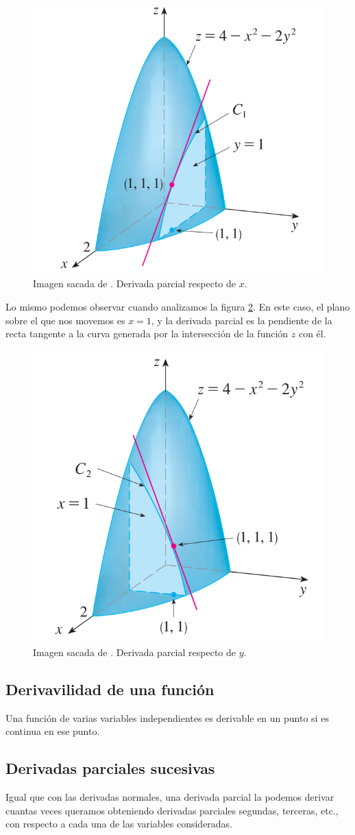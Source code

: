 \documentclass[12pt]{article}
\begin{document}
\begin{figure}[H]
  \centering
  \includegraphics[width=0.3\linewidth]{imagenes/interp_geom_derivada_paracial_x.png}
  \caption{Imagen sacada de \parencite{stewart2}. Derivada parcial respecto de $ x $.}
  \label{fig:derivada_parcial_x}
\end{figure}

Lo mismo podemos observar cuando analizamos la figura \ref{fig:derivada_parcial_y}. En este caso, el plano sobre el que nos movemos es $ x = 1 $, y la derivada parcial es la pendiente de la recta tangente a la curva generada por la intersección de la función $ z $ con él.

\begin{figure}[H]
  \centering
  \includegraphics[width=0.3\linewidth]{imagenes/interp_geom_derivada_paracial_y.png}
  \caption{Imagen sacada de \parencite{stewart2}. Derivada parcial respecto de $ y $.}
  \label{fig:derivada_parcial_y}
\end{figure}

\subsection*{Derivavilidad de una función}
Una función de varias variables independientes es derivable en un punto si es continua en ese punto.

\subsection{Derivadas parciales sucesivas}
Igual que con las derivadas normales, una derivada parcial la podemos derivar cuantas veces queramos obteniendo derivadas parciales segundas, terceras, etc., con respecto a cada una de las variables consideradas.
\end{document}
